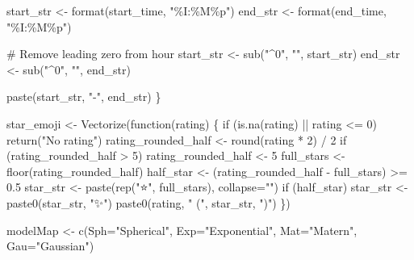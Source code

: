 \documentclass[
  12pt,
  letterpaper,
  DIV=11,
  numbers=noendperiod]{scrartcl}
\newenvironment{Shaded}{\begin{snugshade}}{\end{snugshade}}
\newcommand{\AttributeTok}[1]{\textcolor[rgb]{0.98,0.46,0.51}{#1}}
\newcommand{\CommentTok}[1]{\textcolor[rgb]{0.42,0.45,0.49}{#1}}
\newcommand{\ControlFlowTok}[1]{\textcolor[rgb]{0.98,0.46,0.51}{#1}}
\newcommand{\DecValTok}[1]{\textcolor[rgb]{0.47,0.72,1.00}{#1}}
\newcommand{\FloatTok}[1]{\textcolor[rgb]{0.47,0.72,1.00}{#1}}
\newcommand{\FunctionTok}[1]{\textcolor[rgb]{0.70,0.57,0.94}{#1}}
\newcommand{\NormalTok}[1]{\textcolor[rgb]{0.88,0.89,0.91}{#1}}
\newcommand{\OtherTok}[1]{\textcolor[rgb]{0.70,0.57,0.94}{#1}}
\newcommand{\SpecialCharTok}[1]{\textcolor[rgb]{0.47,0.72,1.00}{#1}}
\newcommand{\StringTok}[1]{\textcolor[rgb]{0.62,0.80,1.00}{#1}}
\begin{document}
\begin{Shaded}
\begin{Highlighting}[]
\NormalTok{  start\_str }\OtherTok{\textless{}{-}} \FunctionTok{format}\NormalTok{(start\_time, }\StringTok{"\%I:\%M\%p"}\NormalTok{)}
\NormalTok{  end\_str   }\OtherTok{\textless{}{-}} \FunctionTok{format}\NormalTok{(end\_time,   }\StringTok{"\%I:\%M\%p"}\NormalTok{)}
  
  \CommentTok{\# Remove leading zero from hour}
\NormalTok{  start\_str }\OtherTok{\textless{}{-}} \FunctionTok{sub}\NormalTok{(}\StringTok{"\^{}0"}\NormalTok{, }\StringTok{""}\NormalTok{, start\_str)}
\NormalTok{  end\_str   }\OtherTok{\textless{}{-}} \FunctionTok{sub}\NormalTok{(}\StringTok{"\^{}0"}\NormalTok{, }\StringTok{""}\NormalTok{, end\_str)}
  
  \FunctionTok{paste}\NormalTok{(start\_str, }\StringTok{"{-}"}\NormalTok{, end\_str)}
\NormalTok{\}}

\NormalTok{star\_emoji }\OtherTok{\textless{}{-}} \FunctionTok{Vectorize}\NormalTok{(}\ControlFlowTok{function}\NormalTok{(rating) \{}
  \ControlFlowTok{if}\NormalTok{ (}\FunctionTok{is.na}\NormalTok{(rating) }\SpecialCharTok{||}\NormalTok{ rating }\SpecialCharTok{\textless{}=} \DecValTok{0}\NormalTok{) }\FunctionTok{return}\NormalTok{(}\StringTok{"No rating"}\NormalTok{)}
\NormalTok{  rating\_rounded\_half }\OtherTok{\textless{}{-}} \FunctionTok{round}\NormalTok{(rating }\SpecialCharTok{*} \DecValTok{2}\NormalTok{) }\SpecialCharTok{/} \DecValTok{2}
  \ControlFlowTok{if}\NormalTok{ (rating\_rounded\_half }\SpecialCharTok{\textgreater{}} \DecValTok{5}\NormalTok{) rating\_rounded\_half }\OtherTok{\textless{}{-}} \DecValTok{5}
\NormalTok{  full\_stars }\OtherTok{\textless{}{-}} \FunctionTok{floor}\NormalTok{(rating\_rounded\_half)}
\NormalTok{  half\_star  }\OtherTok{\textless{}{-}}\NormalTok{ (rating\_rounded\_half }\SpecialCharTok{{-}}\NormalTok{ full\_stars) }\SpecialCharTok{\textgreater{}=} \FloatTok{0.5}
\NormalTok{  star\_str   }\OtherTok{\textless{}{-}} \FunctionTok{paste}\NormalTok{(}\FunctionTok{rep}\NormalTok{(}\StringTok{"⭐"}\NormalTok{, full\_stars), }\AttributeTok{collapse=}\StringTok{""}\NormalTok{)}
  \ControlFlowTok{if}\NormalTok{ (half\_star) star\_str }\OtherTok{\textless{}{-}} \FunctionTok{paste0}\NormalTok{(star\_str, }\StringTok{"✨"}\NormalTok{)}
  \FunctionTok{paste0}\NormalTok{(rating, }\StringTok{" ("}\NormalTok{, star\_str, }\StringTok{")"}\NormalTok{)}
\NormalTok{\})}

\NormalTok{modelMap }\OtherTok{\textless{}{-}} \FunctionTok{c}\NormalTok{(}\AttributeTok{Sph=}\StringTok{"Spherical"}\NormalTok{, }\AttributeTok{Exp=}\StringTok{"Exponential"}\NormalTok{, }\AttributeTok{Mat=}\StringTok{"Matern"}\NormalTok{, }\AttributeTok{Gau=}\StringTok{"Gaussian"}\NormalTok{)}


\end{Highlighting}
\end{Shaded}
\end{document}
